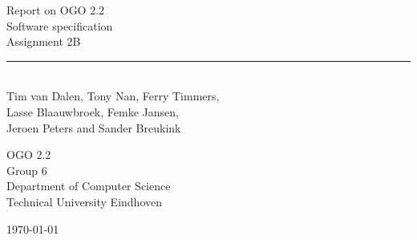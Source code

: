 \begin{titlepage}
	\begin{center}
		
		{\Huge Report on OGO 2.2\\ Software specification}\\[0.5cm]
		{\huge Assignment 2B}\\
		\rule{\linewidth}{0.5mm}\\[0.5cm]
		
		
		{\Large
		Tim van Dalen, Tony Nan, Ferry Timmers,\\ 
		Lasse Blaauwbroek, Femke Jansen,\\
		Jeroen Peters and Sander Breukink\\[1cm]
		}
		
		{\large
		OGO 2.2\\
		Group 6 \\[1cm]
		Department of Computer Science\\
		Technical University Eindhoven\\[1cm]
		}
		
		\vfill

		{\large \today}
	\end{center}
\end{titlepage}